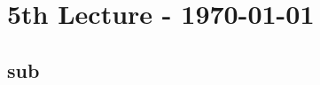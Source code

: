 \documentclass{article}
\begin{document}
	\newpage
	
	\section{5th Lecture - \today}
	\begin{adjustwidth}{2em}{2em}
		\subsection{sub}
		\begin{adjustwidth}{2em}{2em}
		\end{adjustwidth}
	\end{adjustwidth}
\end{document}
